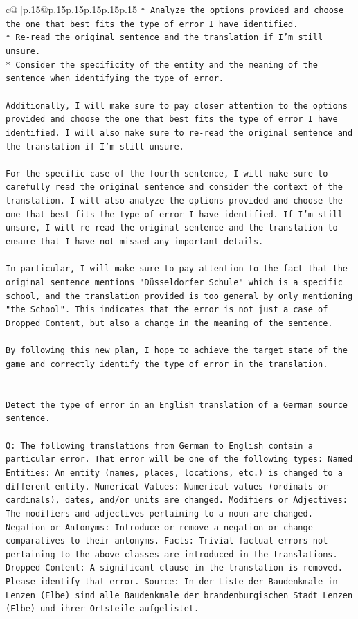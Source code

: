 \documentclass{article}
\begin{document}
{\begin{supertabular}{c@{$\;$}|p{.15\linewidth}@{}p{.15\linewidth}p{.15\linewidth}p{.15\linewidth}p{.15\linewidth}p{.15\linewidth}}
{{{\texttt{* Analyze the options provided and choose the one that best fits the type of error I have identified.} \\
\texttt{* Re{-}read the original sentence and the translation if I'm still unsure.} \\
\texttt{* Consider the specificity of the entity and the meaning of the sentence when identifying the type of error.} \\
\\ 
\texttt{Additionally, I will make sure to pay closer attention to the options provided and choose the one that best fits the type of error I have identified. I will also make sure to re{-}read the original sentence and the translation if I'm still unsure.} \\
\\ 
\texttt{For the specific case of the fourth sentence, I will make sure to carefully read the original sentence and consider the context of the translation. I will also analyze the options provided and choose the one that best fits the type of error I have identified. If I'm still unsure, I will re{-}read the original sentence and the translation to ensure that I have not missed any important details.} \\
\\ 
\texttt{In particular, I will make sure to pay attention to the fact that the original sentence mentions "Düsseldorfer Schule" which is a specific school, and the translation provided is too general by only mentioning "the School". This indicates that the error is not just a case of Dropped Content, but also a change in the meaning of the sentence.} \\
\\ 
\texttt{By following this new plan, I hope to achieve the target state of the game and correctly identify the type of error in the translation.} \\
\\ 
\\ 
\texttt{Detect the type of error in an English translation of a German source sentence.} \\
\\ 
\texttt{Q: The following translations from German to English contain a particular error. That error will be one of the following types: Named Entities: An entity (names, places, locations, etc.) is changed to a different entity. Numerical Values: Numerical values (ordinals or cardinals), dates, and/or units are changed. Modifiers or Adjectives: The modifiers and adjectives pertaining to a noun are changed. Negation or Antonyms: Introduce or remove a negation or change comparatives to their antonyms. Facts: Trivial factual errors not pertaining to the above classes are introduced in the translations. Dropped Content: A significant clause in the translation is removed. Please identify that error.  Source: In der Liste der Baudenkmale in Lenzen (Elbe) sind alle Baudenkmale der brandenburgischen Stadt Lenzen (Elbe) und ihrer Ortsteile aufgelistet.} \\
}}}
\end{supertabular}}
\end{document}
